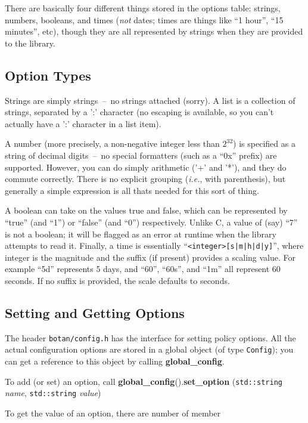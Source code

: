 \documentclass{article}
\newcommand{\filename}[1]{\texttt{#1}}
\newcommand{\function}[1]{\textbf{#1}}
\newcommand{\type}[1]{\texttt{#1}}
\renewcommand{\arg}[1]{\textsl{#1}}
\newcommand{\ie}[0]{\emph{i.e.}}
\begin{document}
There are basically four different things stored in the options table: strings,
numbers, booleans, and times (\emph{not} dates; times are things like ``1
hour'', ``15 minutes'', etc), though they are all represented by strings when
they are provided to the library.

\subsection{Option Types}

Strings are simply strings~--~no strings attached (sorry). A list is a
collection of strings, separated by a ':' character (no escaping is available,
so you can't actually have a ':' character in a list item).

A number (more precisely, a non-negative integer less than $2^{32}$) is
specified as a string of decimal digits~--~no special formatters (such as a
``0x'' prefix) are supported. However, you can do simply arithmetic ('+' and
'*'), and they do commute correctly. There is no explicit grouping (\ie, with
parenthesis), but generally a simple expression is all thats needed for this
sort of thing.

A boolean can take on the values true and false, which can be represented by
``true'' (and ``1'') or ``false'' (and ``0'') respectively. Unlike C, a value
of (say) ``7'' is not a boolean; it will be flagged as an error at runtime when
the library attempts to read it. Finally, a time is essentially
``\texttt{<integer>[s|m|h|d|y]}'', where integer is the magnitude and the
suffix (if present) provides a scaling value. For example ``5d'' represents 5
days, and ``60'', ``60s'', and ``1m'' all represent 60 seconds. If no suffix is
provided, the scale defaults to seconds.

\subsection{Setting and Getting Options}

The header \filename{botan/config.h} has the interface for setting
policy options. All the actual configuration options are stored in a
global object (of type \type{Config}); you can get a reference to this
object by calling \function{global\_config}.

To add (or set) an option, call
\function{global\_config}().\function{set\_option} (\type{std::string}
\arg{name}, \type{std::string} \arg{value})

To get the value of an option, there are number of member 
\end{document}
